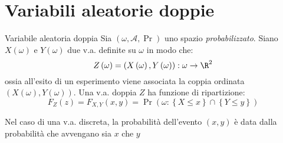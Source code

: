 \section{Variabili aleatorie doppie}
\begin{definizione}{Variabile aleatoria doppia}
	Sia $ \left(\omega , \mathcal{A}, \Pr\right) $ uno spazio \textit{probabilizzato}. Siano $ X\left(\omega \right) $ e $ Y\left(\omega \right) $ due v.a. definite su $ \omega  $ in modo che:
	\[
		Z \left(\omega \right) = \left(X \left(\omega \right), Y \left(\omega \right)\right): \omega  \to  \R ^2
	\]
	ossia all'esito di un esperimento viene associata la coppia ordinata $ \left(X \left(\omega \right), Y\left(\omega \right)\right) $. Una v.a. doppia $ Z $ ha funzione di ripartizione:
	\[
		F_Z \left(z\right) = F_{X, Y} \left(x,y\right) = \Pr\left(\omega  : \left\{ X \le  x\right\} \cap  \left\{ Y \le  y\right\}\right)
	\]
\end{definizione}
Nel caso di una v.a. discreta, la probabilità dell'evento $ \left(x,y\right) $ è data dalla probabilità che avvengano sia $ x $ che $ y $
